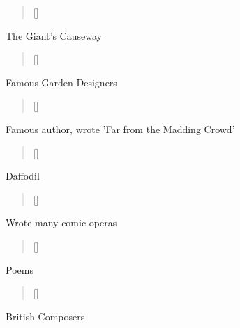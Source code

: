 \documentclass[grid,avery5371]{flashcards}
\begin{document}
\begin{flashcard}[]{%
\begin{verse}[\versewidth]
\end{verse}}

The Giant's Causeway

\end{flashcard}

\begin{flashcard}[]{%
\begin{verse}[\versewidth]
\end{verse}}

Famous Garden Designers

\end{flashcard}

\begin{flashcard}[]{%
\begin{verse}[\versewidth]
\end{verse}}

Famous author, wrote 'Far from the Madding Crowd'

\end{flashcard}

\begin{flashcard}[]{%
\begin{verse}[\versewidth]
\end{verse}}

Daffodil

\end{flashcard}

\begin{flashcard}[]{%
\begin{verse}[\versewidth]
\end{verse}}

Wrote many comic operas

\end{flashcard}


\begin{flashcard}[]{%
\begin{verse}[\versewidth]
\end{verse}}

Poems

\end{flashcard}

\begin{flashcard}[]{%
\begin{verse}[\versewidth]
\end{verse}}

British Composers

\end{flashcard}
\end{document}
